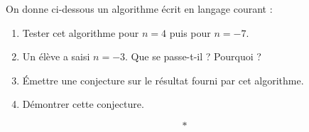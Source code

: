 \documentclass[10pt,openright,twoside,french]{book}
\begin{document}

\exo

On donne ci-dessous un algorithme écrit en langage courant :

\begin{center}
\small
\end{center}

\begin{enumerate}
    \item Tester cet algorithme pour $n = 4$ puis pour $n = -7$.
    \item Un élève a saisi $n = -3$. Que se passe-t-il ? Pourquoi ?
    \item \'Emettre une conjecture sur le résultat fourni par cet algorithme.
    \item Démontrer cette conjecture.
\end{enumerate}\[*\]

\exo
\end{document}
